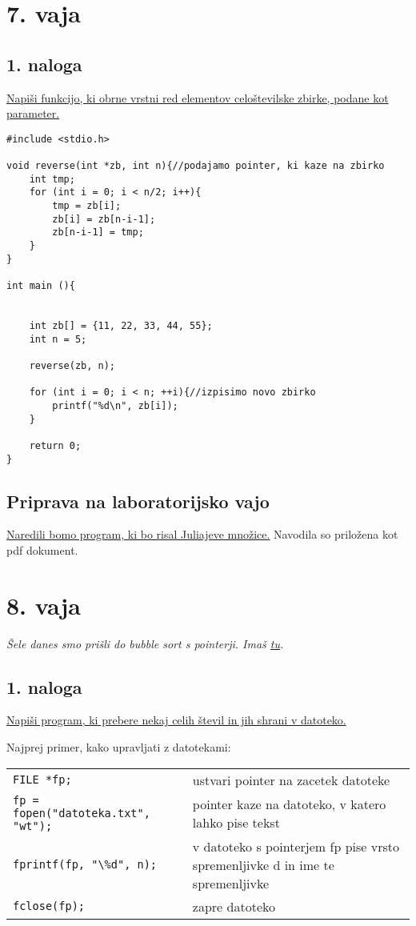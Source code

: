 \documentclass[a4paper, 12pt]{article}
\begin{document}
\section*{7. vaja}

\subsection*{1. naloga}

\underline{Napiši funkcijo, ki obrne vrstni red elementov celoštevilske zbirke, podane kot parameter.}

\begin{lstlisting}
#include <stdio.h>

void reverse(int *zb, int n){//podajamo pointer, ki kaze na zbirko
	int tmp;
	for (int i = 0; i < n/2; i++){
		tmp = zb[i];
		zb[i] = zb[n-i-1];
		zb[n-i-1] = tmp;
	}
}

int main (){
	
	
	int zb[] = {11, 22, 33, 44, 55};
	int n = 5;
	
	reverse(zb, n);
	
	for (int i = 0; i < n; ++i){//izpisimo novo zbirko
		printf("%d\n", zb[i]);
	}
	
	return 0;
}
\end{lstlisting}


\subsection*{Priprava na laboratorijsko vajo}
\underline{Naredili bomo program, ki bo risal Juliajeve množice.}
Navodila so priložena kot pdf dokument.

\section*{8. vaja}

\emph{Šele danes smo prišli do bubble sort s pointerji. Imaš \hyperref[sortbuble]{tu}.}


\subsection*{1. naloga}

\underline{Napiši program, ki prebere nekaj celih števil in jih shrani v datoteko.}

Najprej primer, kako upravljati z datotekami:
\begin{table}[!h]
	\begin{tabular}{|l|l|}
		\lstinline|FILE *fp;|&ustvari pointer na zacetek datoteke\\
		\lstinline|fp = fopen("datoteka.txt", "wt");|&pointer kaze na datoteko, v katero lahko pise tekst\\
		\lstinline|fprintf(fp, "\%d", n);|&v datoteko s pointerjem fp pise vrsto spremenljivke d in ime te spremenljivke\\
		\lstinline|fclose(fp);|&zapre datoteko\\
	\end{tabular}
\end{table}
\end{document}
